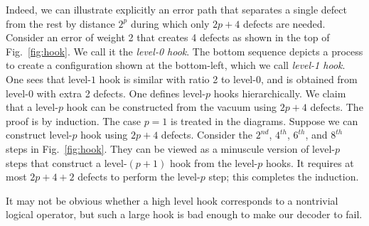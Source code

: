 Indeed, we can illustrate explicitly an error path that separates 
a single defect from the rest by distance $2^p$ during which only $2p+4$ defects are needed.
Consider an error of weight 2 that creates 4 defects as shown in the top of Fig.~\ref{fig:hook}.
We call it the {\em level-0 hook}.
The bottom sequence depicts a process to create a configuration shown at the bottom-left,
which we call {\em level-1 hook}. 
One sees that level-$1$ hook is similar with ratio 2 to level-$0$, 
and is obtained from level-0 with extra 2 defects.
One defines level-$p$ hooks hierarchically.
We claim that a level-$p$ hook can be constructed from the vacuum using $2p+4$ defects.
The proof is by induction.
The case $p=1$ is treated in the diagrams.
Suppose we can construct level-$p$ hook using $2p+4$ defects.
Consider the $2^{nd}$, $4^{th}$, $6^{th}$, and $8^{th}$ steps in Fig.~\ref{fig:hook}.
They can be viewed as a minuscule version of level-$p$ steps 
that construct a level-$(p+1)$ hook from the level-$p$ hooks. 
It requires at most $2p+4+2$ defects to perform the level-$p$ step; 
this completes the induction.

It may not be obvious whether a high level hook corresponds to a nontrivial logical operator,
but such a large hook is bad enough to make our decoder to fail.
